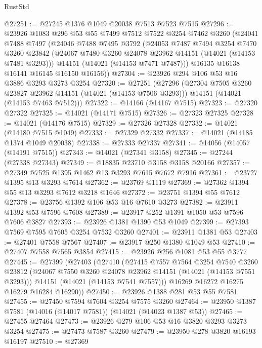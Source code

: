 \begin{lexlean}{RustStd}
\begin{coremodule}
@27251 := @27245 @1376 @1049 @20038 @7513 @7523 @7515
@27296 := @23926
    @1083
    @296
    @53
    @55
    @7499
    @7512
    @7522
    @3254
    @7462
    @3260
    (@24041
      @7488
      @7497
      (@24046
        @7488
        @7495
        @3792
        (@24053
          @7487
          @7494
          @3254
          @7470
          @3260
          @23842
          (@24067 @7480 @3260 @24078 @23962 @14151 (@14021 (@14153 @7481 @3293)))
          @14151
          (@14021 (@14153 @7471 @7487)))
        @16135
        @16138
        @16141
        @16145
        @16150
        @16156))
@27304 := @23926 @294 @106 @53 @16 @3886 @3293 @3273 @3254
@27320 := @27251
    (@27296
      (@27304 @7505 @3260 @23827 @23962 @14151 (@14021 (@14153 @7506 @3293)))
      @14151
      (@14021 (@14153 @7463 @7512)))
@27322 := @14166 (@14167 @7515)
@27323 := @27320 @27322
@27325 := @14021 (@14171 @7515)
@27326 := @27323 @27325
@27328 := @14021 (@14176 @7515)
@27329 := @27326 @27328
@27332 := @14021 (@14180 @7515 @1049)
@27333 := @27329 @27332
@27337 := @14021 (@14185 @1374 @1049 @20038)
@27338 := @27333 @27337
@27341 := @14056 (@14057 (@14191 @7515))
@27343 := @14021 (@27341 @3158)
@27345 := @27244 (@27338 @27343)
@27349 := @18835 @23710 @3158 @3158 @20166
@27357 := @27349 @7525 @1395 @1462 @13 @3293 @7615 @7672 @7916
@27361 := @23727 @1395 @13 @3293 @7614
@27362 := @23769 @1119
@27369 := @27362 @1394 @55 @13 @3293 @7612 @3218 @1646
@27372 := @23751 @1394 @55 @7612
@27378 := @23756 @1392 @106 @53 @16 @7610 @3273
@27382 := @23911 @1392 @53 @7596 @7608
@27389 := @23917 @252 @1391 @1050 @53 @7596 @7606 @3827
@27393 := @23926 @1381 @1390 @53 @1049
@27399 := @27393 @7569 @7595 @7605 @3254 @7532 @3260
@27401 := @23911 @1381 @53
@27403 := @27401 @7558 @7567
@27407 := @23917 @250 @1380 @1049 @53
@27410 := @27407 @7558 @7565 @3854
@27415 := @23926 @256 @1081 @53 @55 @3777
@27445 := @27399
    (@27403
      (@27410
        (@27415
          @7557
          @7564
          @3254
          @7540
          @3260
          @23812
          (@24067 @7550 @3260 @24078 @23962 @14151 (@14021 (@14153 @7551 @3293)))
          @14151
          (@14021 (@14153 @7541 @7557)))
        @16269
        @16272
        @16275
        @16279
        @16284
        @16290))
@27450 := @23926 @1388 @281 @53 @55 @7581
@27455 := @27450 @7594 @7604 @3254 @7575 @3260
@27464 := @23950 @1387 @7581 (@14016 (@14017 @7581)) (@14021 (@14023 @1387 @53))
@27465 := @27455 @27464
@27473 := @23926 @279 @106 @53 @16 @3820 @3293 @3273 @3254
@27475 := @27473 @7587 @3260
@27479 := @23950 @278 @3820 @16193 @16197
@27510 := @27369

\end{coremodule}
\end{lexlean}
